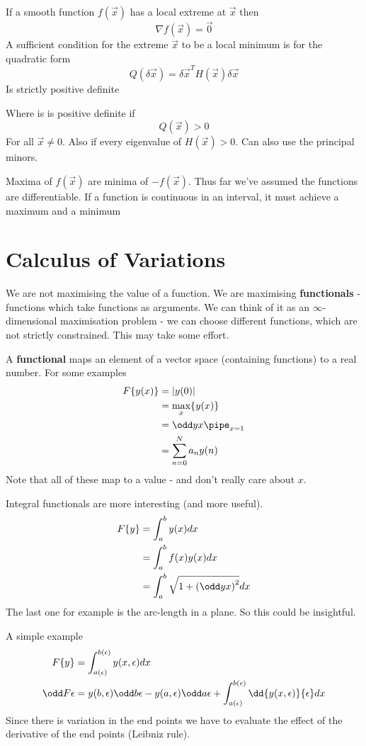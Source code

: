 \documentclass{E:/Documents/Latex/myassignment}
\begin{document}
If a smooth function $f(\vec x)$ has a local extreme at $\vec x$ then
\[\nabla f(\vec x) = \vec 0\]
A sufficient condition for the extreme $\vec x$ to be a local minimum is for the quadratic form
\[Q(\delta \vec x) = \delta \vec x^T H(\vec x) \delta \vec x\]
Is strictly positive definite

Where is is positive definite if 
\[Q(\vec x) > 0\]
For all $\vec x \neq 0$. Also if every eigenvalue of $H(\vec x) > 0$.
Can also use the principal minors.

Maxima of $f(\vec x)$ are minima of $-f(\vec x)$. 
Thus far we've assumed the functions are differentiable.
If a function is continuous in an interval, it must achieve a maximum and a minimum

\section{Calculus of Variations}
We are not maximising the value of a function. We are maximising \textbf{functionals} - functions which take functions as arguments.
We can think of it as an $\infty$- dimensional maximisation problem - we can choose different functions, which are not strictly constrained. 
This may take some effort.

A \textbf{functional} maps an element of a vector space (containing functions) to a real number.
For some examples
\begin{align*}
	F\{y(x)\} &= |y(0)|\\
	&= \max_x \{y(x)\}\\
	&= \odd yx \pipe_{x=1}\\
	&= \sum_{n=0}^N a_n y(n)
\end{align*}
Note that all of these map to a value - and don't really care about $x$.


Integral functionals are more interesting (and more useful).
\begin{align*}
	F\{y\} &= \int_a^b y(x)dx\\
	&= \int_a^b f(x) y(x) dx\\
	&= \int_a^b \sqrt{1+\left(\odd yx\right)^2} dx
\end{align*}
The last one for example is the arc-length in a plane. So this could be insightful.

A simple example
\begin{align*}
	F\{y\} &= \int_{a(\epsilon)}^{b(\epsilon)} y(x,\epsilon) dx\\
	\odd F\epsilon &= y(b,\epsilon) \odd b\epsilon - y(a,\epsilon) \odd a \epsilon + \int_{a(\epsilon)}^{b(\epsilon)} \dd{y(x,\epsilon)}{\epsilon} dx
\end{align*}
Since there is variation in the end points we have to evaluate the effect of the derivative of the end points (Leibniz rule). 
\end{document}
